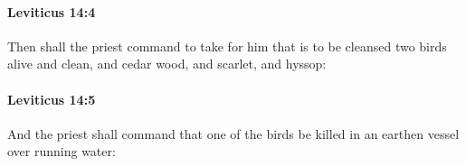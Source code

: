 		\paragraph{Leviticus 14:4} %
			\label{LEVITICUS-14-4}

			Then shall the priest command to take for him that is to be cleansed two birds alive and clean, and cedar wood, and scarlet, and hyssop:


		\paragraph{Leviticus 14:5} %
			\label{LEVITICUS-14-5}

			And the priest shall command that one of the birds be killed in an earthen vessel over running water:



